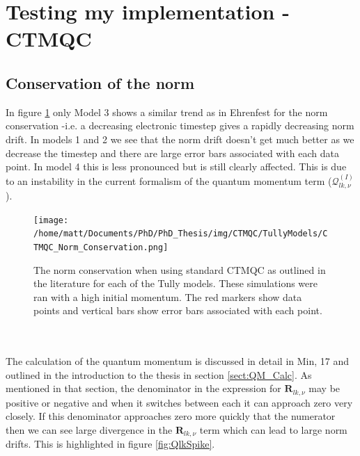 \section{Testing my implementation -CTMQC}
\subsection{Conservation of the norm}
In figure \ref{fig:CTMQCNormCons} only Model 3 shows a similar trend as in Ehrenfest for the norm conservation -i.e. a decreasing electronic timestep gives a rapidly decreasing norm drift. In models 1 and 2 we see that the norm drift doesn't get much better as we decrease the timestep and there are large error bars associated with each data point. In model 4 this is less pronounced but is still clearly affected. This is due to an instability in the current formalism of the quantum momentum term ($\mathcal{Q}_{lk, \nu}^{(I)}$).
\begin{figure}[ht]
	\texttt{[image: /home/matt/Documents/PhD/PhD\_Thesis/img/CTMQC/TullyModels/CTMQC\_Norm\_Conservation.png]}
	\caption{\label{fig:CTMQCNormCons}The norm conservation when using standard CTMQC as outlined in the literature for each of the Tully models. These simulations were ran with a high initial momentum. The red markers show data points and vertical bars show error bars associated with each point.}
\end{figure}
\\\\
The calculation of the quantum momentum is discussed in detail in Min, 17 \cite{min_ab_2017} and outlined in the introduction to the thesis in section \ref{sect:QM_Calc}. As mentioned in that section, the denominator in the expression for $\mathbf{R}_{lk, \nu}$ may be positive or negative and when it switches between each it can approach zero very closely. If this denominator approaches zero more quickly that the numerator then we can see large divergence in the $\mathbf{R}_{lk, \nu}$ term which can lead to large norm drifts. This is highlighted in figure \ref{fig:QlkSpike}.

